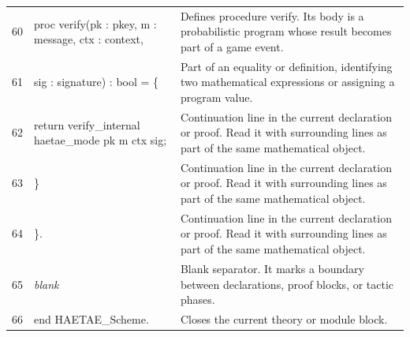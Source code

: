 \documentclass[10pt]{article}
\begin{document}
\begin{longtable}{r L{0.53\textwidth} L{0.37\textwidth}}
60 & {\ttfamily\scriptsize   proc verify(pk : pkey, m : message, ctx : context,} & Defines procedure verify.  Its body is a probabilistic program whose result becomes part of a game event. \\
61 & {\ttfamily\scriptsize               sig : signature) : bool = \{} & Part of an equality or definition, identifying two mathematical expressions or assigning a program value. \\
62 & {\ttfamily\scriptsize     return verify\_internal haetae\_mode pk m ctx sig;} & Continuation line in the current declaration or proof.  Read it with surrounding lines as part of the same mathematical object. \\
63 & {\ttfamily\scriptsize   \}} & Continuation line in the current declaration or proof.  Read it with surrounding lines as part of the same mathematical object. \\
64 & {\ttfamily\scriptsize \}.} & Continuation line in the current declaration or proof.  Read it with surrounding lines as part of the same mathematical object. \\
65 & {\ttfamily\scriptsize \emph{blank}} & Blank separator.  It marks a boundary between declarations, proof blocks, or tactic phases. \\
66 & {\ttfamily\scriptsize end HAETAE\_Scheme.} & Closes the current theory or module block. \\
\bottomrule
\end{longtable}
\end{document}
